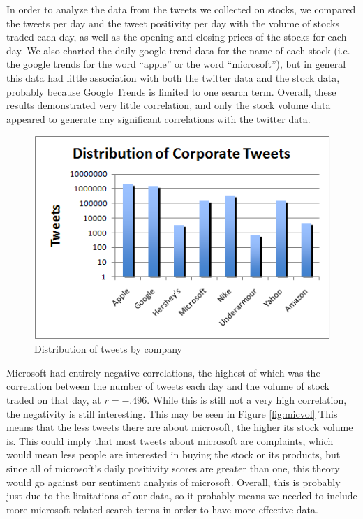 \documentclass[11pt]{article}
\begin{document}
In order to analyze the data from the tweets we collected on stocks, we compared the tweets per day and the tweet positivity per day with the volume of stocks traded each day, as well as the opening and closing prices of the stocks for each day.  We also charted the daily google trend data for the name of each stock (i.e. the google trends for the word “apple” or the word “microsoft”), but in general this data had little association with both the twitter data and the stock data, probably because Google Trends is limited to one search term.  Overall, these results demonstrated very little correlation, and only the stock volume data appeared to generate any significant correlations with the twitter data.
\begin{figure}[ht!]
\centering
\includegraphics[scale=.65]{img/purestocktweets.png} 
\caption{Distribution of tweets by company}
\end{figure}

Microsoft had entirely negative correlations, the highest of which was the correlation between the number of tweets each day and the volume of stock traded on that day, at $r=-.496$.  While this is still not a very high correlation, the negativity is still interesting. This may be seen in Figure \ref{fig:micvol} This means that the less tweets there are about microsoft, the higher its stock volume is.  This could imply that most tweets about microsoft are complaints, which would mean less people are interested in buying the stock or its products, but since all of microsoft’s daily positivity scores are greater than one, this theory would go against our sentiment analysis of microsoft.  Overall, this is probably just due to the limitations of our data, so it probably means we needed to include more microsoft-related search terms in order to have more effective data.
\end{document}
